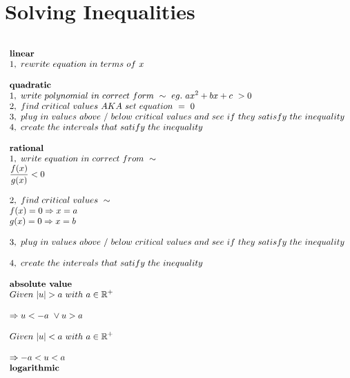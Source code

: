 \documentclass{article}
\begin{document}
    \section{Solving Inequalities}
\[
\begin{array}{>{\displaystyle}l}
    \\
    \textbf{linear}\\
    1,\ rewrite\ equation\ in\ terms\ of\ x\\
    \\
    \textbf{quadratic}\\
    1,\ write\ polynomial\ in\ correct\ form\ \sim \ eg.\ ax^{2} +bx+c\  >0\\
    2,\ find\ critical\ values\ AKA\ set\ equation\ =\ 0\ \\
    3,\ plug\ in\ values\ above\ /\ below\ critical\ values\ and\ see\ if\ they\ satisfy\ the\ inequality\ \\
    4,\ create\ the\ intervals\ that\ satify\ the\ inequality\\
    \\
    \textbf{rational}\\
    1,\ write\ equation\ in\ correct\ from\ \sim \ \ \\
    \frac{f( x)}{g( x)} < 0\ \\
    \\
    2,\ find\ critical\ values\ \sim \ \\
    f( x) =0\Rightarrow x=a\ \\
    g( x) =0\Rightarrow x=b\\
    \\
    3,\ plug\ in\ values\ above\ /\ below\ critical\ values\ and\ see\ if\ they\ satisfy\ the\ inequality\ \\
    \\
    4,\ create\ the\ intervals\ that\ satify\ the\ inequality\\
    \\
    \textbf{absolute\ value\ }\\
    Given\ |u| >a\ with\ a\in \mathbb{R}^{+}\\
    \\
    \Rightarrow u< -a\ \lor u >a\\
    \\
    Given\ |u|< a\ with\ a\in \mathbb{R}^{+ }\\
    \\
    \Rightarrow -a< u< a
    \\
    \textbf{logarithmic\ }\\

\end{array}\]
\end{document}
